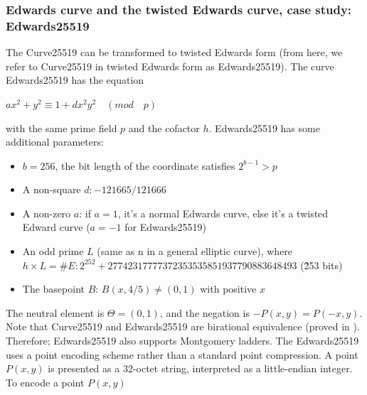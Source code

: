 \subsubsection{Edwards curve and the twisted Edwards curve, case study: Edwards25519}

The Curve25519 can be transformed to twisted Edwards form (from here, we refer to Curve25519 in twisted Edwards form as Edwards25519). The curve Edwards25519 has the equation

\hspace{0.25cm}
\begin{center}
  $ax^2 + y^2 \equiv 1 + dx^2 y^2 \quad (mod \quad p)$
\end{center}
\hspace{0.25cm}

with the same prime field $p$ and the cofactor $h$. Edwards25519 has some additional parameters:

\begin{itemize}
  \item $b = 256$, the bit length of the coordinate satisfies $2^{b-1} > p$
  \item A non-square $d: -121665/121666$
  \item A non-zero $a$: if $a = 1$, it's a normal Edwards curve, else it's a twisted Edward curve ($a = -1$ for Edwards25519)
  \item An odd prime $L$ (same as n in a general elliptic curve), where $h \times L = \#E: 2^{252}+27742317777372353535851937790883648493$ (\~253 bits)
  \item The basepoint $B$: $B(x, 4/5) \neq (0, 1)$ with positive $x$
\end{itemize}


The neutral element is $\Theta = (0,1)$, and the negation is $-P(x, y) = P(-x, y)$. Note that Curve25519 and Edwards25519 are birational equivalence (proved in \cite{Bernstein2011}). Therefore; Edwards25519 also supports Montgomery ladders. The Edwards25519 uses a point encoding scheme rather than a standard point compression. A point $P(x, y)$ is presented as a 32-octet string, interpreted as a little-endian integer. To encode a point $P(x, y)$\\

